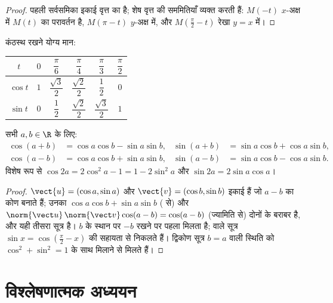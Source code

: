 \begin{proof}
पहली सर्वसमिका इकाई वृत्त का  है; शेष वृत्त की सममितियाँ व्यक्त करती
हैं: $M(-t)$ $x$-अक्ष में $M(t)$ का परावर्तन है, $M(\pi - t)$ $y$-अक्ष में, और $M(\frac\pi2 - t)$
रेखा $y = x$ में।
\end{proof}

कंठस्थ रखने योग्य मान:
\begin{center}
\begin{tabular}{c|ccccc}
$t$ & $0$ & $\dfrac{\pi}{6}$ & $\dfrac{\pi}{4}$ & $\dfrac{\pi}{3}$ & $\dfrac{\pi}{2}$\\[6pt]
\hline\rule{0pt}{14pt}%
$\cos t$ & $1$ & $\dfrac{\sqrt3}{2}$ & $\dfrac{\sqrt2}{2}$ & $\dfrac12$ & $0$\\[6pt]
$\sin t$ & $0$ & $\dfrac12$ & $\dfrac{\sqrt2}{2}$ & $\dfrac{\sqrt3}{2}$ & $1$
\end{tabular}
\end{center}

\begin{proposition}[योग सूत्र]\label{prop:g12:trigo:addition}
सभी $a, b \in \R$ के लिए:
\begin{align*}
\cos(a+b) &= \cos a \cos b - \sin a \sin b, &
\sin(a+b) &= \sin a \cos b + \cos a \sin b,\\
\cos(a-b) &= \cos a \cos b + \sin a \sin b, &
\sin(a-b) &= \sin a \cos b - \cos a \sin b.
\end{align*}
विशेष रूप से $\cos 2a = 2\cos^2 a - 1 = 1 - 2\sin^2 a$ और $\sin 2a = 2 \sin a \cos a$।
\end{proposition}

\begin{proof}
 $\vect{u} = (\cos a, \sin a)$ और $\vect{v} = (\cos b, \sin b)$ इकाई  हैं जो $a - b$ का कोण बनाते हैं; उनका 
$\cos a\cos b + \sin a \sin b$ ( से) और $\norm{\vect u}\,\norm{\vect v}\cos(a-b) = \cos(a - b)$ (ज्यामिति से) दोनों के बराबर है, और यही तीसरा
सूत्र है। $b$ के स्थान पर $-b$ रखने पर पहला मिलता है;  वाले सूत्र $\sin x = \cos(\frac\pi2 - x)$
की सहायता से निकलते हैं। द्विकोण सूत्र $b = a$ वाली स्थिति को $\cos^2 + \sin^2 = 1$ के साथ मिलाने
से मिलते हैं।
\end{proof}

\section{विश्लेषणात्मक अध्ययन}

